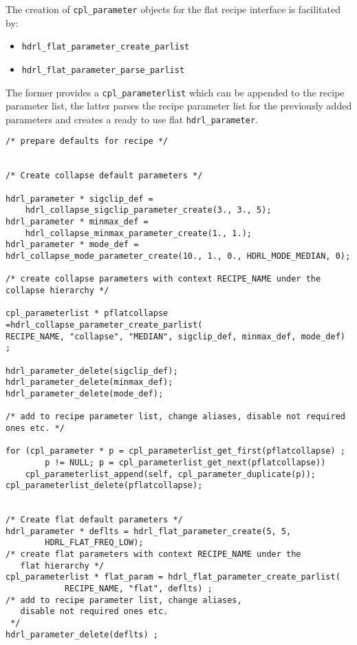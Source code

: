 The creation of \verb+cpl_parameter+ objects for the flat recipe interface is
facilitated by:
\begin{itemize}
\item \verb+hdrl_flat_parameter_create_parlist+
\item \verb+hdrl_flat_parameter_parse_parlist+
\end{itemize}
The former provides a \verb+cpl_parameterlist+ which can be appended
to the recipe parameter list, the latter parses the recipe parameter
list for the previously added parameters and creates a ready to use
flat \verb+hdrl_parameter+.


\begin{lstlisting}
/* prepare defaults for recipe */


/* Create collapse default parameters */

hdrl_parameter * sigclip_def = 
    hdrl_collapse_sigclip_parameter_create(3., 3., 5);
hdrl_parameter * minmax_def =
    hdrl_collapse_minmax_parameter_create(1., 1.);
hdrl_parameter * mode_def =
hdrl_collapse_mode_parameter_create(10., 1., 0., HDRL_MODE_MEDIAN, 0);

/* create collapse parameters with context RECIPE_NAME under the
collapse hierarchy */

cpl_parameterlist * pflatcollapse =hdrl_collapse_parameter_create_parlist(
RECIPE_NAME, "collapse", "MEDIAN", sigclip_def, minmax_def, mode_def) ;

hdrl_parameter_delete(sigclip_def); 
hdrl_parameter_delete(minmax_def);
hdrl_parameter_delete(mode_def);

/* add to recipe parameter list, change aliases, disable not required ones etc. */

for (cpl_parameter * p = cpl_parameterlist_get_first(pflatcollapse) ;
        p != NULL; p = cpl_parameterlist_get_next(pflatcollapse))
    cpl_parameterlist_append(self, cpl_parameter_duplicate(p));
cpl_parameterlist_delete(pflatcollapse);


/* Create flat default parameters */
hdrl_parameter * deflts = hdrl_flat_parameter_create(5, 5,
        HDRL_FLAT_FREQ_LOW);
/* create flat parameters with context RECIPE_NAME under the
   flat hierarchy */
cpl_parameterlist * flat_param = hdrl_flat_parameter_create_parlist(
            RECIPE_NAME, "flat", deflts) ;
/* add to recipe parameter list, change aliases,
   disable not required ones etc.
 */
hdrl_parameter_delete(deflts) ;
\end{lstlisting}

